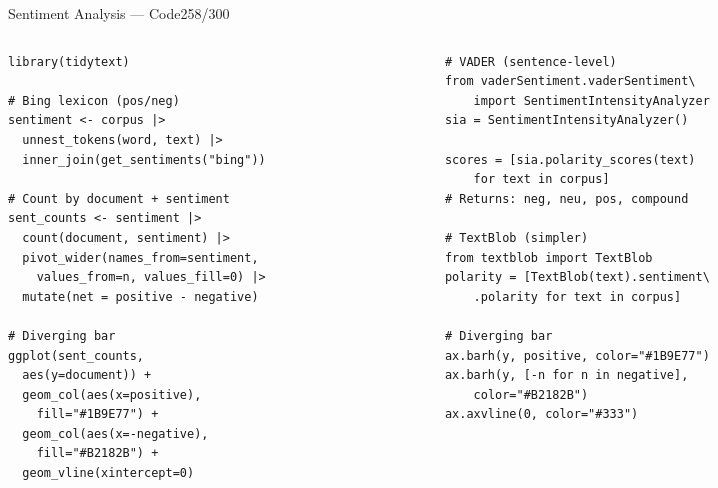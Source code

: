 \documentclass[10pt]{beamer}
\newcommand{\smark}[1]{\hfill{\scriptsize\color{codegray}#1}}
\begin{document}
\begin{frame}[fragile]{Sentiment Analysis --- Code}\smark{258/300}
\begin{columns}[T]
\begin{column}{0.48\textwidth}
\begin{lstlisting}[style=Rstyle]
library(tidytext)

# Bing lexicon (pos/neg)
sentiment <- corpus |>
  unnest_tokens(word, text) |>
  inner_join(get_sentiments("bing"))

# Count by document + sentiment
sent_counts <- sentiment |>
  count(document, sentiment) |>
  pivot_wider(names_from=sentiment,
    values_from=n, values_fill=0) |>
  mutate(net = positive - negative)

# Diverging bar
ggplot(sent_counts,
  aes(y=document)) +
  geom_col(aes(x=positive),
    fill="#1B9E77") +
  geom_col(aes(x=-negative),
    fill="#B2182B") +
  geom_vline(xintercept=0)
\end{lstlisting}
\end{column}
\begin{column}{0.48\textwidth}
\begin{lstlisting}[style=Pystyle]
# VADER (sentence-level)
from vaderSentiment.vaderSentiment\
    import SentimentIntensityAnalyzer
sia = SentimentIntensityAnalyzer()

scores = [sia.polarity_scores(text)
    for text in corpus]
# Returns: neg, neu, pos, compound

# TextBlob (simpler)
from textblob import TextBlob
polarity = [TextBlob(text).sentiment\
    .polarity for text in corpus]

# Diverging bar
ax.barh(y, positive, color="#1B9E77")
ax.barh(y, [-n for n in negative],
    color="#B2182B")
ax.axvline(0, color="#333")
\end{lstlisting}
\end{column}
\end{columns}
\end{frame}
\end{document}
